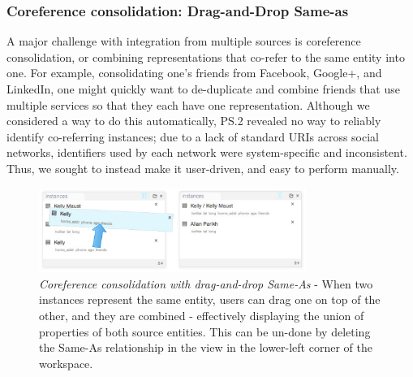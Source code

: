 \documentclass{sigchi}
\begin{document}
%
%
%
\subsubsection{Coreference consolidation: Drag-and-Drop Same-as}

A major challenge with integration from multiple sources is coreference consolidation, or combining representations that co-refer to the same entity into one.  For example, consolidating one's friends from Facebook, Google+, and LinkedIn, one might quickly want to de-duplicate and combine friends that use multiple services so that they each have one representation.  Although we considered a way to do this automatically, PS.2 revealed no way to reliably identify co-referring instances; due to a lack of standard URIs across social networks, identifiers used by each network were system-specific and inconsistent. Thus, we sought to instead make it user-driven, and easy to perform manually.  

\begin{figure}[htbp]
\begin{center}
\includegraphics[width=8.7cm]{img/sameas}
\caption{\emph{Coreference consolidation with drag-and-drop Same-As} - When two instances represent the same entity, users can drag one on top of the other, and they are combined - effectively displaying the union of properties of both source entities. This can be un-done by deleting the Same-As relationship in the view in the lower-left corner of the workspace.}
\label{fig:sameas}
\end{center}
\end{figure}
\end{document}
